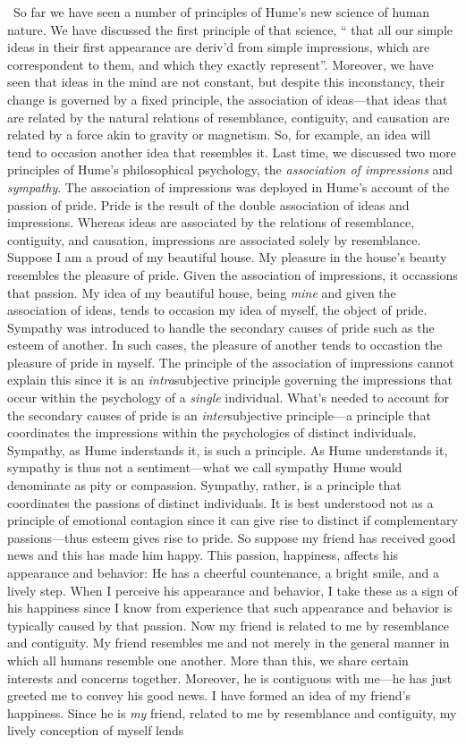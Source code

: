 \change\ So far we have seen a number of principles of Hume's new science of human nature. We have discussed the first principle of that science, `` that all our simple ideas in their first appearance are deriv’d from simple impressions, which are correspondent to them, and which they exactly represent''. Moreover, we have seen that ideas in the mind are not constant, but despite this inconstancy, their change is governed by a fixed principle, the association of ideas---that ideas that are related by the natural relations of resemblance, contiguity, and causation are related by a force akin to gravity or magnetism. So, for example, an idea will tend to occasion another idea that resembles it. Last time, we discussed two more principles of Hume's philosophical psychology, the \emph{association of impressions} and \emph{sympathy}. The association of impressions was deployed in Hume's account of the passion of pride. Pride is the result of the double association of ideas and impressions. Whereas ideas are associated by the relations of resemblance, contiguity, and causation, impressions are associated solely by resemblance. Suppose I am a proud of my beautiful house. My pleasure in the house's beauty resembles the pleasure of pride. Given the association of impressions, it occassions that passion. My idea of my beautiful house, being \emph{mine} and given the association of ideas, tends to occasion my idea of myself, the object of pride. Sympathy was introduced to handle the secondary causes of pride such as the esteem of another. In such cases, the pleasure of another tends to occastion the pleasure of pride in myself. The principle of the association of impressions cannot explain this since it is an \emph{intra}subjective principle governing the impressions that occur within the psychology of a \emph{single} individual. What's needed to account for the secondary causes of pride is an \emph{inter}subjective principle---a principle that coordinates the impressions within the psychologies of distinct individuals. Sympathy, as Hume inderstands it, is such a principle. As Hume understands it, sympathy is thus not a sentiment---what we call sympathy Hume would denominate as pity or compassion. Sympathy, rather, is a principle that coordinates the passions of distinct individuals. It is best understood not as a principle of emotional contagion since it can give rise to distinct if complementary passions---thus esteem gives rise to pride. So suppose my friend has received good news and this has made him happy. This passion, happiness, affects his appearance and behavior: He has a cheerful countenance, a bright smile, and a lively step. When I perceive his appearance and behavior, I take these as a sign of his happiness since I know from experience that such appearance and behavior is typically caused by that passion. Now my friend is related to me by resemblance and contiguity. My friend resembles me and not merely in the general manner in which all humans resemble one another. More than this, we share certain interests and concerns together. Moreover, he is contiguous with me---he has just greeted me to convey his good news. I have formed an idea of my friend's happiness. Since he is \emph{my} friend, related to me by resemblance and contiguity, my lively conception of myself lends 